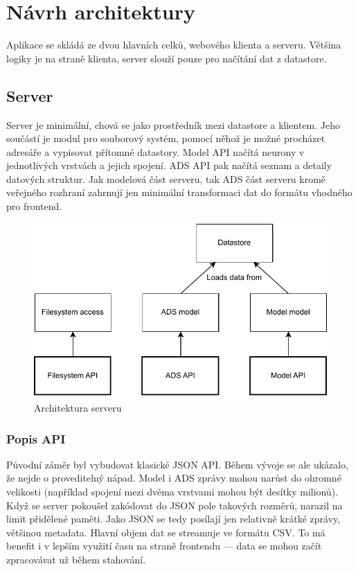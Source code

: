 \chapter{Návrh architektury}

Aplikace se skládá ze dvou hlavních celků, webového klienta a serveru. Většina logiky je na straně klienta, server slouží pouze pro načítání dat z datastore.

\section{Server}

Server je minimální, chová se jako prostředník mezi datastore a klientem. Jeho součástí je modul pro souborový systém, pomocí něhož je možné procházet adresáře a vypisovat přítomné datastory. Model API načítá neurony v jednotlivých vrstvách a jejich spojení. ADS API pak načítá seznam a detaily datových struktur. Jak modelová část serveru, tak ADS část serveru kromě veřejného rozhraní zahrnují jen minimální transformaci dat do formátu vhodného pro frontend.

\begin{figure}
  \centering
  \includegraphics[width=.7\linewidth]{img/server_diagram.pdf}
  \caption{Architektura serveru}
\end{figure}

\subsection{Popis API}

Původní záměr byl vybudovat klasické JSON API. Během vývoje se ale ukázalo, že nejde o proveditelný nápad. Model i ADS zprávy mohou narůst do ohromné velikosti (například spojení mezi dvěma vrstvami mohou být desítky milionů). Když se server pokoušel zakódovat do JSON pole takových rozměrů, narazil na limit přidělené paměti. Jako JSON se tedy posílají jen relativně krátké zprávy, většinou metadata. Hlavní objem dat se streamuje ve formátu CSV. To má benefit i v lepším využití času na straně frontendu --- data se mohou začít zpracovávat už během stahování.

